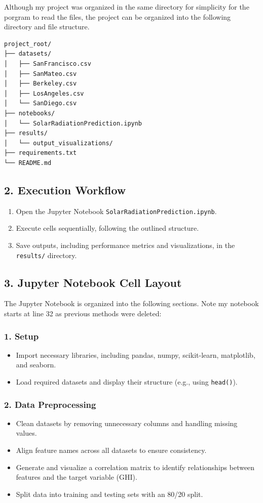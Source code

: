 \documentclass[10pt,twocolumn]{article}
\begin{document}
    \begin{itemize}
Although my project was organized in the same directory for simplicity for the porgram to read the files, the project can be organized into the following directory and file structure. 
\begin{verbatim}
project_root/
├── datasets/
│   ├── SanFrancisco.csv
│   ├── SanMateo.csv
│   ├── Berkeley.csv
│   ├── LosAngeles.csv
│   └── SanDiego.csv
├── notebooks/
│   └── SolarRadiationPrediction.ipynb
├── results/
│   └── output_visualizations/
├── requirements.txt
└── README.md
\end{verbatim}
\subsection*{2. Execution Workflow}
\begin{enumerate}
    \item Open the Jupyter Notebook \texttt{SolarRadiationPrediction.ipynb}.
    \item Execute cells sequentially, following the outlined structure.
    \item Save outputs, including performance metrics and visualizations, in the \texttt{results/} directory.
\end{enumerate}

\subsection*{3. Jupyter Notebook Cell Layout}
The Jupyter Notebook is organized into the following sections. Note my notebook starts at line 32 as previous methods were deleted:

\subsubsection*{1. Setup}
\begin{itemize}
    \item Import necessary libraries, including pandas, numpy, scikit-learn, matplotlib, and seaborn.
    \item Load required datasets and display their structure (e.g., using \texttt{head()}).
\end{itemize}

\subsubsection*{2. Data Preprocessing}
\begin{itemize}
    \item Clean datasets by removing unnecessary columns and handling missing values.
    \item Align feature names across all datasets to ensure consistency.
    \item Generate and visualize a correlation matrix to identify relationships between features and the target variable (GHI).
    \item Split data into training and testing sets with an 80/20 split.
\end{itemize}


\end{itemize}
\end{document}
